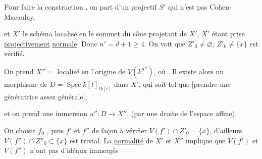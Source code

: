 Pour faire la construction , on part d'un   projectif  $S'$   qui n'est pas Cohen-Macaulay, \deleted{\unsure{tel qu'on} \unsure{appart} [l'un des} 

et  $X'$ le schéma localisé en le sommet du cône projetant de $X'$, $X'$ étant prise \uline{projectivement} \uline{normale}. Donc $n'=d+1\geq4$.  On voit que  $Z'_0\ne\varnothing$, $Z'_0\ne\{x\}$ est vérifié.

On prend $X''=$  localisé en l'origine de $V(k^{n''})$, où . Il existe alors un morphisme  de $D=\operatorname{Spec} k[t]_{t k[t]}$ dans $X'$, qui soit tel que  [prendre une génératrice assez générale],

et on prend une immersion $u'':D\longrightarrow X''$. (par une droite de l'espace affine).

On choisit $f_0$ , puis $f'$ et $f''$ de façon à vérifier $V(f')\cap Z'_0=\{x\}$,  d'ailleurs $V(f'')\cap Z''_0\subset\{x\}$ est trivial. La \uline{normalité} de $X'$ et $X''$ implique que $V(f')$ et $V(f'')$ n'ont pas d'idéaux immergés \textendash\textendash

